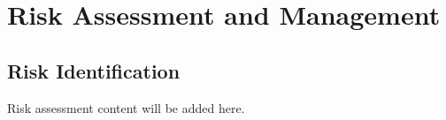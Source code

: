 \chapter{Risk Assessment and Management}
\section{Risk Identification}
Risk assessment content will be added here.
